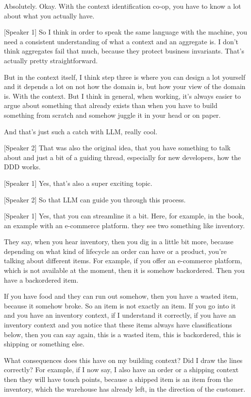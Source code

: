 Absolutely. Okay. With the context identification co-op, you have to know a lot about what you actually have.

[Speaker 1]
So I think in order to speak the same language with the machine, you need a consistent understanding of what a context and an aggregate is. I don't think aggregates fail that much, because they protect business invariants. That's actually pretty straightforward.

But in the context itself, I think step three is where you can design a lot yourself and it depends a lot on not how the domain is, but how your view of the domain is. With the context. But I think in general, when working, it's always easier to argue about something that already exists than when you have to build something from scratch and somehow juggle it in your head or on paper.

And that's just such a catch with LLM, really cool.

[Speaker 2]
That was also the original idea, that you have something to talk about and just a bit of a guiding thread, especially for new developers, how the DDD works.

[Speaker 1]
Yes, that's also a super exciting topic.

[Speaker 2]
So that LLM can guide you through this process.

[Speaker 1]
Yes, that you can streamline it a bit. Here, for example, in the book, an example with an e-commerce platform. they see two something like inventory.

They say, when you hear inventory, then you dig in a little bit more, because depending on what kind of lifecycle an order can have or a product, you're talking about different items. For example, if you offer an e-commerce platform, which is not available at the moment, then it is somehow backordered. Then you have a backordered item.

If you have food and they can run out somehow, then you have a wasted item, because it somehow broke. So an item is not exactly an item. If you go into it and you have an inventory context, if I understand it correctly, if you have an inventory context and you notice that these items always have classifications below, then you can say again, this is a wasted item, this is backordered, this is shipping or something else.

What consequences does this have on my building context? Did I draw the lines correctly? For example, if I now say, I also have an order or a shipping context then they will have touch points, because a shipped item is an item from the inventory, which the warehouse has already left, in the direction of the customer.


